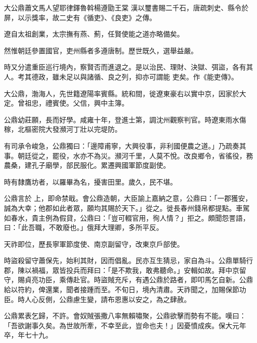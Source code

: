 
\begin{pinyinscope}

 大公鼎蕭文馬人望耶律鐸魯斡楊遵勖王棠
 漢以璽書賜二千石，唐疏刺史、縣令於屏，以示獎率，故二史有《循吏》、《良吏》之傳。



 遼自太祖創業，太宗撫有燕、薊，任賢使能之道亦略備矣。



 然惟朝廷參置國官，吏州縣者多遵唐制。歷世既久，選舉益嚴。



 時又分遣重臣巡行境內，察賢否而進退之。是以治民、理財、決獄、弭盜，各有其人。考其德政，雖未足以與諸循、良之列，抑亦可謂能
 吏矣。作《能吏傳》。



 大公鼎，渤海人，先世籍遼陽率賓縣。統和間，徙遼東豪右以實中京，因家於大定。曾祖忠，禮賓使。父信，興中主簿。



 公鼎幼莊願，長而好學。咸雍十年，登進士第，調沈州觀察判官。時遼東雨水傷稼，北樞密院大發瀕河丁壯以完堤防。



 有司承令峻急，公鼎獨曰：「邊障甫寧，大興役事，非利國便農之道。」乃疏奏其事。朝廷從之，罷役，水亦不為災。瀕河千里，人莫不悅。改良鄉令，省徭役，務農桑，建孔子廟學，部民服化。累遷興國軍節度副使。



 時有隸鷹坊者，以羅畢為名，擾害田里。歲久，民不堪。



 公鼎言於
 上，即命禁戢。會公鼎造朝，大臣諭上嘉納之意，公鼎曰：「一郡獲安，誠為大幸；他郡如此者眾，願均其賜於天下。」從之。徙長春州錢帛都提點。車駕如春水，貴主例為假貸，公鼎曰：「豈可輟官用，徇人情？」拒之。頗聞怨詈語，曰：「此吾職，不敢廢也。」俄拜大理卿，多所平反。



 天祚即位，歷長寧軍節度使、南京副留守，改東京戶部使。



 時盜殺留守蕭保先，始利其財，因而倡亂。民亦互生猜忌，家自為斗。公鼎單騎行郡，陳以禍福，眾皆投兵而拜曰：「是不欺我，敢弗聽命。」安輯如故。拜中京留守，賜貞亮功臣，乘傳赴官。時盜賊充斥，有遇公鼎於路者，即叩馬乞自新。公鼎
 給以符約，俾還業，聞者接踵而至。不旬日，境內清肅。天祚聞之，加賜保節功臣。時人心反側，公鼎慮生變，請布恩惠以安之，為之肆赦。



 公鼎累表乞歸，不許。會奴賊張撒八率無賴嘯聚，公鼎欲擊而勢有不能。嘆曰：「吾欲謝事久矣。為世故所牽，不幸至此，豈命也夫！」因憂憤成疾。保大元年卒，年七十九。




\end{pinyinscope}
